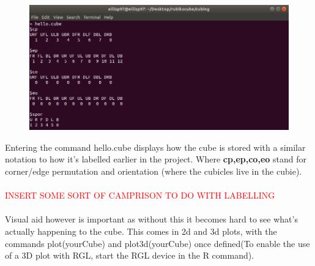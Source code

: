 \documentclass{article}
\begin{document}
\begin{figure}[h]
	\centering
	\includegraphics[scale=.75]{terminalcube.png}
\end{figure}
Entering the command hello.cube displays how the cube is stored with a similar notation to how it's labelled earlier in the project. Where \textbf{cp,ep,co,eo} stand for corner/edge permutation and orientation (where the cubicles live in the cubie).
\paragraph*{}
\textcolor{red}{INSERT SOME SORT OF CAMPRISON TO DO WITH LABELLING}
\paragraph*{}
Visual aid however is important as without this it becomes hard to see what's actually happening to the cube. This comes in 2d and 3d plots, with the commands plot(yourCube) and plot3d(yourCube) once defined(To enable the use of a 3D plot with RGL, start the RGL device in the R command).
\end{document}
